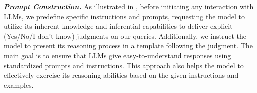 \begin{comment}
    \midrule
    \textbf{Verb Phrase in Active Voice} & \begin{tabular}[l]{@{}l@{}} - Is it true that \textit{Subject Relation Object}?  \\ - \textit{Subject} \textit{Relation} \textit{Object}. Please judge the truthfulness of this statement.\\ Other formats... \end{tabular} & \begin{tabular}[l]{@{}l@{}} New Triple: \textit{[Baby Don't Lie, appeared\_before, Spark the Fire]}\\ Template: - Is it true that \textit{Baby Don't Lie} appeared before \textit{Spark the Fire}? - Yes.\\- \textit{Baby Don't Lie} never appeared before \textit{Spark the Fire}. \\ Please judge the truthfulness of this statement. -No.   \end{tabular} \\
    \bottomrule %
\end{tabular}}
\end{table*}
\end{comment}

\textbf{\emph{Prompt Construction.}}
As illustrated in , before initiating any interaction with LLMs, we predefine specific instructions and prompts, requesting the model to utilize its inherent knowledge and inferential capabilities to deliver explicit (Yes/No/I don't know) judgments on our queries. Additionally, we instruct the model to present its reasoning process in a template following the judgment. The main goal is to ensure that LLMs give easy-to-understand responses using standardized prompts and instructions. 
This approach also helps the model to effectively exercise its reasoning abilities based on the given instructions and examples.


